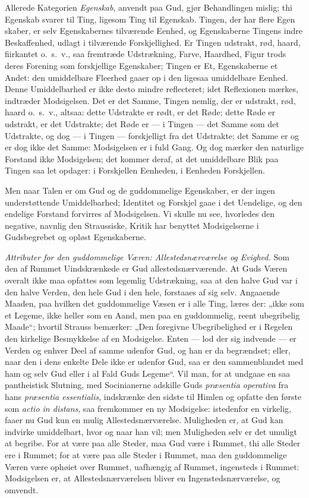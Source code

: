 \documentclass[12pt]{book}
\begin{document}
Allerede Kategorien \emph{Egenskab}, anvendt paa Gud, gjør
Behandlingen mislig; thi Egenskab svarer til Ting, ligesom Ting til
Egenskab. Tingen, der har flere Egen\-
skaber, er selv Egenskabernes tilværende Eenhed, og Egenskaberne
Tingens indre Beskaffenhed, udlagt i tilværende Forskjellighed. Er
Tingen udstrakt, rød, haard, fiirkantet o.\ s.\ v., saa fremtræde
Udstrækning, Farve, Haardhed, Figur trods deres Forening som
forskjellige Egenskaber; Tingen er Et, Egenskaberne et Andet: den
umiddelbare Fleerhed gaaer op i den ligesaa umiddelbare Eenhed.
Denne Umiddelbarhed er ikke desto mindre reflecteret; idet
Reflexionen mærkes, indtræder Modsigelsen. Det er det Samme, Tingen
nemlig, der er udstrakt, rød, haard o.\ s.\ v., altsaa: dette
Udstrakte er rødt, er det Røde; dette Røde er udstrakt, er det
Udstrakte; det Røde er --- i Tingen --- det Samme som det Udstrakte,
og dog --- i Tingen --- forskjelligt fra det Udstrakte; det Samme er
og er dog ikke det Samme: Modsigelsen er i fuld Gang. Og dog mærker
den naturlige Forstand ikke Modsigelsen; det kommer deraf, at det
umiddelbare Blik paa Tingen saa let opdager: i Forskjellen Eenheden,
i Eenheden Forskjellen.

Men naar Talen er om Gud og de guddommelige Egenskaber, er der ingen
understøttende Umiddelbarhed; Identitet og Forskjel gaae i det
Uendelige, og den endelige Forstand forvirres af Modsigelsen. Vi
skulle nu see, hvorledes den negative, navnlig den Straussiske,
Kritik har benyttet Modsigelserne i Gudsbegrebet og opløst
Egenskaberne.

\emph{Attributer for den guddommelige Væren: Allestedsnærværelse og
Evighed.} Som den af Rummet Uindskrænkede er Gud
allestedsnærværende. At Guds Væren overalt ikke maa opfattes som
legemlig Udstrækning, saa at den halve Gud var i den halve Verden,
den hele Gud i den hele, forstaaes af sig selv. Angaaende Maaden,
paa hvilken det guddommelige Væsen er i alle Ting, læres der: „ikke
som et Legeme, ikke heller som en Aand, men paa en guddommelig,
reent
ubegribelig Maade“; hvortil Strauss bemærker: „Den foregivne
Ubegribelighed er i Regelen den kirkelige Besmykkelse af en
Modsigelse. Enten --- lod der sig indvende --- er Verden og enhver
Deel af samme udenfor Gud, og han er da begrændset; eller, naar den
i dens enkelte Dele ikke er udenfor Gud, saa er den sammenblandet
med ham og selv Gud eller i al Fald Guds Legeme“. Vil man, for at
undgaae en saa pantheistisk Slutning, med Socinianerne adskille Guds
\textit{præsentia operativa} fra hans \textit{præsentia
essentialis}, indskrænke den sidste til Himlen og opfatte den første
som \textit{actio in distans}, saa fremkommer en ny Modsigelse:
istedenfor en virkelig, faaer nu Gud kun en mulig
Allestedsnærværelse. Muligheden er, at Gud kan indvirke umiddelbart,
hvor og naar han vil; men Muligheden selv er det umuligt at begribe.
For at være paa alle Steder, maa Gud være i Rummet, thi alle Steder
ere i Rummet; for at være paa alle Steder i Rummet, maa den
guddommelige Væren være ophøiet over Rummet, uafhængig af Rummet,
ingensteds i Rummet: Modsigelsen er, at Allestedsnærværelsen bliver
en Ingenstedsnærværelse, og omvendt.
\end{document}

